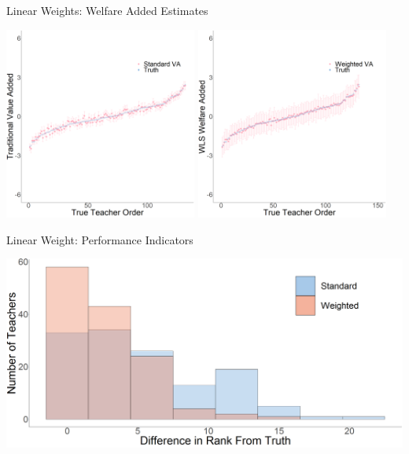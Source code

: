 \documentclass[t,aspectratio=169,11pt]{beamer}
\begin{document}
\begin{frame}{Linear Weights: Welfare Added Estimates} 

\centering
 \includegraphics[width=0.475\textwidth]{slides/Figures/standard_Linear_caterpillar.png}
  \includegraphics[width=0.475\textwidth]{slides/Figures/ww_Linear_caterpillar.png}
\end{frame}


\begin{frame}{Linear Weight: Performance Indicators} 

\centering

\includegraphics[width=.75\linewidth]{slides/Figures/Histrogram_Linear.png}

\scalebox{.8}{
    
}
\end{frame}
\end{document}
